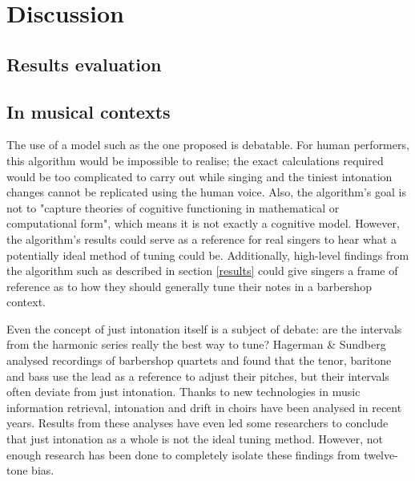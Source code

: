 \documentclass[a4paper]{article}
\begin{document}

\section{Discussion}
\label{discussion}
\subsection{Results evaluation}

\subsection{In musical contexts}
The use of a model such as the one proposed is debatable. For human performers, this algorithm would be impossible to realise; the exact calculations required would be too complicated to carry out while singing and the tiniest intonation changes cannot be replicated using the human voice. Also, the algorithm's goal is not to "capture theories of cognitive functioning in mathematical or computational form", which means it is not exactly a cognitive model.\cite{van_maanen_interpretation_2021} However, the algorithm's results could serve as a reference for real singers to hear what a potentially ideal method of tuning could be. Additionally, high-level findings from the algorithm such as described in section \ref{results} could give singers a frame of reference as to how they should generally tune their notes in a barbershop context.

Even the concept of just intonation itself is a subject of debate: are the intervals from the harmonic series really the best way to tune? Hagerman \& Sundberg analysed recordings of barbershop quartets and found that the tenor, baritone and bass use the lead as a reference to adjust their pitches, but their intervals often deviate from just intonation.\cite{hagerman_fundamental_1980} Thanks to new technologies in music information retrieval, intonation and drift in choirs have been analysed in recent years.\cite{devaney_study_2012, mauch_intonation_2014, dai_intonation_2019} Results from these analyses have even led some researchers to conclude that just intonation as a whole is not the ideal tuning method.\cite{parncutt_psychocultural_2018} However, not enough research has been done to completely isolate these findings from twelve-tone bias.
\end{document}
